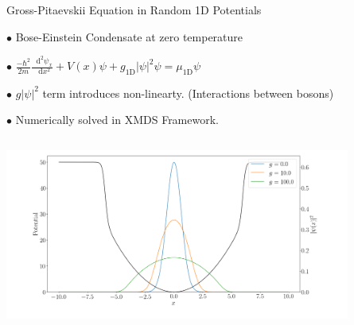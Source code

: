 \documentclass{beamer}
\newcommand*\dif{\mathop{}\!\mathrm{d}}
\begin{document}
\begin{frame}{Gross-Pitaevskii Equation in Random 1D Potentials}

$\bullet$ Bose-Einstein Condensate at zero temperature
\vskip 0.3cm

$\bullet$ $\frac{-\hbar^2}{2m}\frac{\dif^2\psi_x}{\dif x^2} + V(x)\psi + g_{1\text{D}}|\psi|^2\psi = \mu_{1\text{D}}\psi $
\vskip 0.3cm

$\bullet$ $g|\psi|^2$ term introduces non-linearty. (Interactions between bosons)
\vskip 0.3cm

$\bullet$ Numerically solved in XMDS Framework.
\vskip 0.3cm


\begin{columns}
\begin{column}{0.8\textwidth}
    \includegraphics[width=\textwidth]{pot-inter}
\end{column}

\begin{column}{0.2\textwidth}  %
    \begin{center}
\begin{figure}[]
\includegraphics[width=1.3cm]{onedimbose2.png}
\end{figure}
     \end{center}
\end{column}
\end{columns}

\end{frame}
\end{document}
